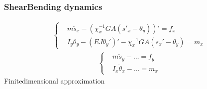 \documentclass[letterpaper,10pt,english]{jupyterBook}
\begin{document}
\subsubsection{Shear\sphinxhyphen{}Bending dynamics}
\label{\detokenize{ch/solids/small-displacements-fem-beams-decoupled:shear-bending-dynamics}}\begin{equation*}
\begin{split}\begin{cases}
  & m \ddot{s}_x - \left( \chi_x^{-1}GA ( s'_x - \theta_y ) \right)' = f_x \\
  & I_y \ddot{\theta}_y - \left( EJ \theta_y' \right)' - \chi_x^{-1}GA \left( s_x' - \theta_y \right) = m_x
\end{cases}\end{split}
\end{equation*}\begin{equation*}
\begin{split}\begin{cases}
  & m \ddot{s}_y - \dots = f_y \\
  & I_x \ddot{\theta}_x - \dots = m_x
\end{cases}\end{split}
\end{equation*}
\sphinxAtStartPar
Finite\sphinxhyphen{}dimensional approximation
\end{document}
